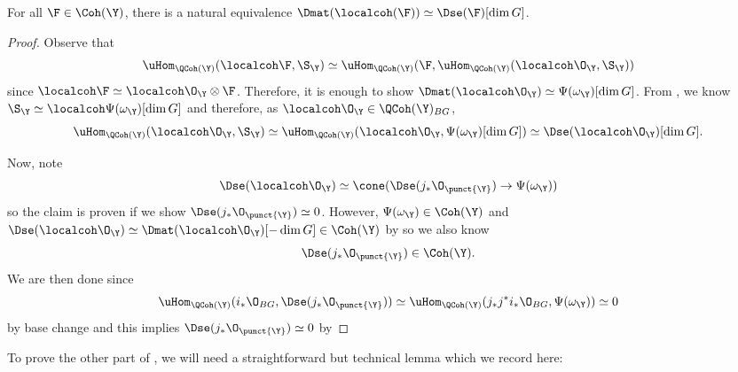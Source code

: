 \documentclass{amsart}
\begin{document}
  \begin{prop}\label{prop:dmat_coh_se}
    For all \(\F \in \Coh(\Y)\), there is a natural equivalence \(\Dmat(\localcoh(\F)) \simeq \Dse(\F)[\dim G]\).
  \end{prop}
  \begin{proof}
    Observe that 
    \begin{displaymath}
      \uHom_{\QCoh(\Y)}(\localcoh \F, \S_\Y) \simeq \uHom_{\QCoh(\Y)}(\F, \uHom_{\QCoh(\Y)}(\localcoh \O_\Y, \S_\Y))
    \end{displaymath}
    since \(\localcoh \F \simeq \localcoh \O_\Y \otimes \F\). Therefore, it
    is enough to show \(\Dmat(\localcoh \O_\Y) \simeq \Psi(\omega_\Y)[\dim G]\).
    From , we know \(\S_\Y \simeq \localcoh \Psi(\omega_\Y)[\dim G]\)
    and therefore, as \(\localcoh \O_\Y \in \QCoh(\Y)_{BG}\),
    \begin{displaymath}
      \uHom_{\QCoh(\Y)}(\localcoh \O_\Y, \S_\Y) \simeq \uHom_{\QCoh(\Y)}(\localcoh \O_\Y, \Psi(\omega_\Y)[\dim G]) \simeq \Dse(\localcoh \O_\Y)[\dim G].
    \end{displaymath}

    Now, note
    \begin{displaymath}
      \Dse(\localcoh \O_\Y) \simeq \cone(\Dse(j_\ast \O_{\punct{\Y}}) \to \Psi(\omega_\Y))
    \end{displaymath}
    so the claim is proven if we show \(\Dse (j_\ast \O_{\punct{\Y}})\simeq 0\).
    However, \(\Psi(\omega_\Y) \in \Coh(\Y)\) and \(\Dse(\localcoh \O_\Y) \simeq \Dmat(\localcoh \O_\Y)[-\dim G] \in \Coh(\Y)\)
    by  so we also know 
    \begin{displaymath}
      \Dse(j_\ast \O_{\punct{\Y}}) \in \Coh(\Y).
    \end{displaymath}
    We are then done since
    \begin{displaymath}
      \uHom_{\QCoh(\Y)}(i_\ast \O_{BG}, \Dse(j_\ast \O_{\punct{\Y}})) \simeq \uHom_{\QCoh(\Y)}(j_\ast j^\ast i_\ast \O_{BG}, \Psi(\omega_\Y)) \simeq 0
    \end{displaymath}
    by base change and this implies \(\Dse(j_\ast \O_{\punct{\Y}}) \simeq 0\) by 
  \end{proof}

  \sssec{}

  To prove the other part of ,
  we will need a straightforward but
  technical lemma which we record here:
\end{document}
